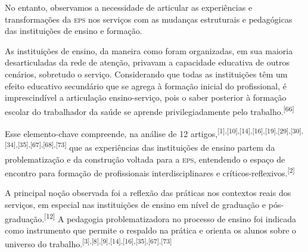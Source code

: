 \documentclass{article}
\begin{document}
No entanto, observamos a necessidade de articular as experiências e
transformações da \textsc{eps} nos serviços com as mudanças estruturais e pedagógicas das
instituições de ensino e formação.

As instituições de ensino, da maneira como foram organizadas, em sua maioria
desarticuladas da rede de atenção, privavam a capacidade educativa de outros
cenários, sobretudo o serviço. Considerando que todas as instituições têm um
efeito educativo secundário que se agrega à formação inicial do profissional, é
imprescindível a articulação ensino-serviço, pois o saber posterior à formação
escolar do trabalhador da saúde se aprende privilegiadamente pelo trabalho.\textsuperscript{[}\textsuperscript{66}\textsuperscript{]}

Esse elemento-chave compreende, na análise de 12 artigos,\textsuperscript{[}\textsuperscript{1}\textsuperscript{]}\textsuperscript{,}\textsuperscript{[}\textsuperscript{10}\textsuperscript{]}\textsuperscript{,}\textsuperscript{[}\textsuperscript{14}\textsuperscript{]}\textsuperscript{,}\textsuperscript{[}\textsuperscript{16}\textsuperscript{]}\textsuperscript{,}\textsuperscript{[}\textsuperscript{19}\textsuperscript{]}\textsuperscript{,}\textsuperscript{[}\textsuperscript{29}\textsuperscript{]}\textsuperscript{,}\textsuperscript{[}\textsuperscript{30}\textsuperscript{]}\textsuperscript{,}\textsuperscript{[}\textsuperscript{34}\textsuperscript{]}\textsuperscript{,}\textsuperscript{[}\textsuperscript{35}\textsuperscript{]}\textsuperscript{,}\textsuperscript{[}\textsuperscript{67}\textsuperscript{]}\textsuperscript{,}\textsuperscript{[}\textsuperscript{68}\textsuperscript{]}\textsuperscript{,}\textsuperscript{[}\textsuperscript{73}\textsuperscript{]}
que as experiências das instituições de ensino partem da problematização e da
construção voltada para a \textsc{eps}, entendendo o espaço de encontro para formação de
profissionais interdisciplinares e críticos-reflexivos.\textsuperscript{[}\textsuperscript{2}\textsuperscript{]}

A principal noção observada foi a reflexão das práticas nos contextos reais dos
serviços, em especial nas instituições de ensino em nível de graduação e
pós-graduação.\textsuperscript{[}\textsuperscript{12}\textsuperscript{]}
A pedagogia problematizadora no processo de ensino foi indicada como instrumento
que permite o respaldo na prática e orienta os alunos sobre o universo do
trabalho.\textsuperscript{[}\textsuperscript{3}\textsuperscript{]}\textsuperscript{,}\textsuperscript{[}\textsuperscript{8}\textsuperscript{]}\textsuperscript{,}\textsuperscript{[}\textsuperscript{9}\textsuperscript{]}\textsuperscript{,}\textsuperscript{[}\textsuperscript{14}\textsuperscript{]}\textsuperscript{,}\textsuperscript{[}\textsuperscript{16}\textsuperscript{]}\textsuperscript{,}\textsuperscript{[}\textsuperscript{35}\textsuperscript{]}\textsuperscript{,}\textsuperscript{[}\textsuperscript{67}\textsuperscript{]}\textsuperscript{,}\textsuperscript{[}\textsuperscript{73}\textsuperscript{]}
\end{document}
